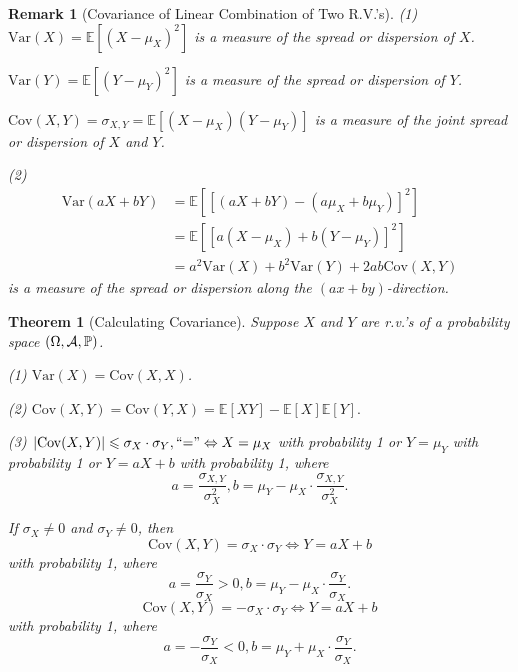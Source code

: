 \documentclass[openany,12pt]{book}
\newtheorem{theorem}{Theorem}[chapter]
\newtheorem{remark}{Remark}[chapter]
\begin{document}
\begin{remark}[Covariance of Linear Combination of Two R.V.'s]
  (1)
  $\mathrm{Var}(X)= \mathbb{E}[(X-\mu_{X})^{2}]$ is a measure of the spread or dispersion of $X$.

  $\mathrm{Var}(Y)= \mathbb{E}[(Y-\mu_{Y})^{2}]$ is a measure of the spread or dispersion of $Y$.

  $\mathrm{Cov}(X,Y)= \sigma_{X,Y} = \mathbb{E}[( X - \mu_{X})(Y-\mu_{Y})]$ is a measure of the joint spread or dispersion of $X$ and $Y$.

  (2)
  \[\begin{aligned}
      \mathrm{Var}(aX + bY) & = \mathbb{E}[ [ ( aX + bY) - ( a\mu_{X} + b\mu_{Y}) ]^{2} ]        \\
                            & = \mathbb{E}[[ a( X - \mu_{X}) + b( Y - \mu_{Y}) ]^{2}]            \\
                            & = a^{2}\mathrm{Var}(X) + b^{2}\mathrm{Var}(Y) + 2ab\mathrm{Cov}(X,Y)
    \end{aligned}\]
  is a measure of the spread or dispersion along the $(ax + by)$-direction.

\end{remark}

\begin{theorem}[Calculating Covariance]
  Suppose $X$ and $Y$ are r.v.'s of a probability space $(\Omega,\mathcal{A},\mathbb{P})$.

  (1) $\mathrm{Var}(X)= \mathrm{Cov}(X,X)$.

  (2)
  $\mathrm{Cov}(X,Y)= \mathrm{Cov}(Y,X)= \mathbb{E}[XY] - \mathbb{E}[X] \mathbb{E}[Y].$

  (3)
  $\left| \mathrm{Cov}(X,Y) \right| \leqslant \sigma_{X}\cdot \sigma_{Y}, \text{``=''} \Leftrightarrow X = \mu_{X}$ with probability 1 or
  $Y = \mu_{Y}$ with probability 1 or $Y=aX+b$ with probability 1, where
  \[a = \frac{\sigma_{X,Y}}{\sigma_{X}^{2}}, b = \mu_{Y} - \mu_{X} \cdot \frac{\sigma_{X,Y}}{\sigma_{X}^{2}}.\]

  If $\sigma_{X} \neq 0$ and $\sigma_{Y} \neq 0$, then
  \[\mathrm{Cov}( X,Y)= \sigma_{X}\cdot \sigma_{Y} \Leftrightarrow Y = aX + b\]
  with probability 1, where
  \[a = \frac{\sigma_{Y}}{\sigma_{X}} > 0, b = \mu_{Y} - \mu_{X} \cdot \frac{\sigma_{Y}}{\sigma_{X}}.\]
  \[\mathrm{Cov}( X,Y)=- \sigma_{X}\cdot \sigma_{Y} \Leftrightarrow Y = aX + b\]
  with probability 1, where
  \[a = - \frac{\sigma_{Y}}{\sigma_{X}} < 0, b = \mu_{Y} + \mu_{X} \cdot \frac{\sigma_{Y}}{\sigma_{X}}.\]
\end{theorem}
\end{document}
